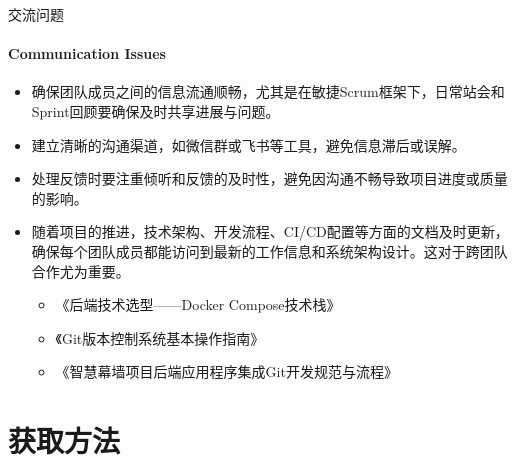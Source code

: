 \documentclass{beamer}
\begin{document}

\begin{frame}[fragile]{交流问题}
\framesubtitle{Communication Issues}
\begin{itemize}
\item 确保团队成员之间的信息流通顺畅，尤其是在敏捷Scrum框架下，日常站会和Sprint回顾要确保及时共享进展与问题。
\item 建立清晰的沟通渠道，如微信群或飞书等工具，避免信息滞后或误解。
\item 处理反馈时要注重倾听和反馈的及时性，避免因沟通不畅导致项目进度或质量的影响。
\item 随着项目的推进，技术架构、开发流程、CI/CD配置等方面的文档及时更新，确保每个团队成员都能访问到最新的工作信息和系统架构设计。这对于跨团队合作尤为重要。
\begin{itemize}
\item 《后端技术选型——Docker Compose技术栈》
\item 《Git版本控制系统基本操作指南》
\item 《智慧幕墙项目后端应用程序集成Git开发规范与流程》
\end{itemize}
\end{itemize}
\end{frame}


\section{获取方法}

\end{document}
